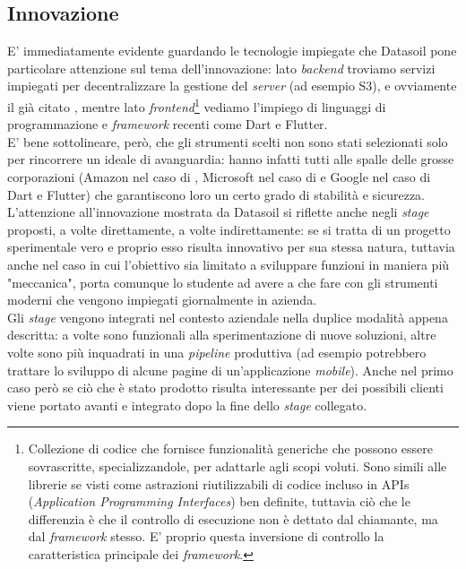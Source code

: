\subsection{Innovazione}
E' immediatamente evidente guardando le tecnologie impiegate che Datasoil pone particolare attenzione sul tema dell'innovazione: lato \textit{backend} troviamo servizi \aws{} impiegati per decentralizzare la gestione del \textit{server} (ad esempio S3), e ovviamente il già citato \asa{}, mentre lato \textit{frontend}\footnote{Collezione di codice che fornisce funzionalità generiche che possono essere sovrascritte, specializzandole, per adattarle agli scopi voluti. Sono simili alle librerie se visti come astrazioni riutilizzabili di codice incluso in APIs (\textit{Application Programming Interfaces}) ben definite, tuttavia ciò che le differenzia è che il controllo di esecuzione non è dettato dal chiamante, ma dal \textit{framework} stesso. E' proprio questa inversione di controllo la caratteristica principale dei \textit{framework}.} vediamo l'impiego di linguaggi di programmazione e \textit{framework} recenti come Dart e Flutter.\\
E' bene sottolineare, però, che gli strumenti scelti non sono stati selezionati solo per rincorrere un ideale di avanguardia: hanno infatti tutti alle spalle delle grosse corporazioni (Amazon nel caso di \aws{}, Microsoft nel caso di \asa{} e Google nel caso di Dart e Flutter) che garantiscono loro un certo grado di stabilità e sicurezza.\\
L'attenzione all'innovazione mostrata da Datasoil si riflette anche negli \textit{stage} proposti, a volte direttamente, a volte indirettamente: se si tratta di un progetto sperimentale vero e proprio esso risulta innovativo per sua stessa natura, tuttavia anche nel caso in cui l'obiettivo sia limitato a sviluppare funzioni in maniera più "meccanica", porta comunque lo studente ad avere a che fare con gli strumenti moderni che vengono impiegati giornalmente in azienda.\\
Gli \textit{stage} vengono integrati nel contesto aziendale nella duplice modalità appena descritta: a volte sono funzionali alla sperimentazione di nuove soluzioni, altre volte sono più inquadrati in una \textit{pipeline} produttiva (ad esempio potrebbero trattare lo sviluppo di alcune pagine di un'applicazione \textit{mobile}). Anche nel primo caso però se ciò che è stato prodotto risulta interessante per dei possibili clienti viene portato avanti e integrato dopo la fine dello \textit{stage} collegato.

